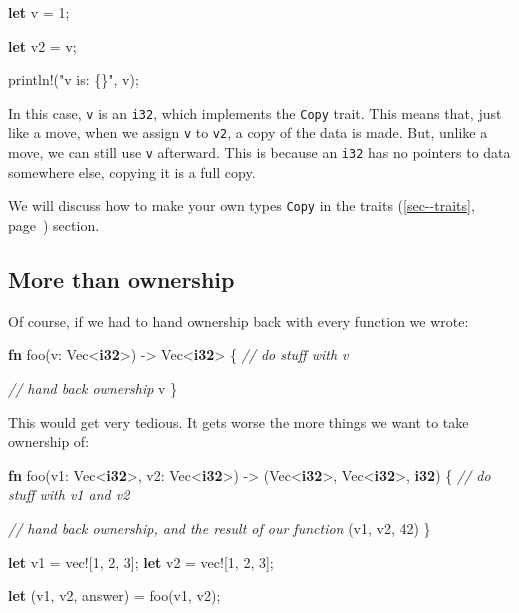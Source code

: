 \documentclass[a4paper,]{book}
\renewcommand*{\hyperref}[2][\ar]{%
  \def\ar{#2}%
  #2 (\autoref{#1}, page~\pageref{#1})}
\newenvironment{Shaded}{\begin{snugshade}}{\end{snugshade}}
\newcommand{\KeywordTok}[1]{\textcolor[rgb]{0.13,0.29,0.53}{\textbf{{#1}}}}
\newcommand{\DecValTok}[1]{\textcolor[rgb]{0.00,0.00,0.81}{{#1}}}
\newcommand{\StringTok}[1]{\textcolor[rgb]{0.31,0.60,0.02}{{#1}}}
\newcommand{\CommentTok}[1]{\textcolor[rgb]{0.56,0.35,0.01}{\textit{{#1}}}}
\newcommand{\OtherTok}[1]{\textcolor[rgb]{0.56,0.35,0.01}{{#1}}}
\newcommand{\NormalTok}[1]{{#1}}
\begin{document}
\begin{Shaded}
\begin{Highlighting}[]
\KeywordTok{let} \NormalTok{v = }\DecValTok{1}\NormalTok{;}

\KeywordTok{let} \NormalTok{v2 = v;}

\OtherTok{println!}\NormalTok{(}\StringTok{"v is: \{\}"}\NormalTok{, v);}
\end{Highlighting}
\end{Shaded}

In this case, \texttt{v} is an \texttt{i32}, which implements the
\texttt{Copy} trait. This means that, just like a move, when we assign
\texttt{v} to \texttt{v2}, a copy of the data is made. But, unlike a
move, we can still use \texttt{v} afterward. This is because an
\texttt{i32} has no pointers to data somewhere else, copying it is a
full copy.

We will discuss how to make your own types \texttt{Copy} in the
\hyperref[sec--traits]{traits} section.

\subsection{More than ownership}\label{more-than-ownership}

Of course, if we had to hand ownership back with every function we
wrote:

\begin{Shaded}
\begin{Highlighting}[]
\KeywordTok{fn} \NormalTok{foo(v: Vec<}\KeywordTok{i32}\NormalTok{>) -> Vec<}\KeywordTok{i32}\NormalTok{> \{}
    \CommentTok{// do stuff with v}

    \CommentTok{// hand back ownership}
    \NormalTok{v}
\NormalTok{\}}
\end{Highlighting}
\end{Shaded}

This would get very tedious. It gets worse the more things we want to
take ownership of:

\begin{Shaded}
\begin{Highlighting}[]
\KeywordTok{fn} \NormalTok{foo(v1: Vec<}\KeywordTok{i32}\NormalTok{>, v2: Vec<}\KeywordTok{i32}\NormalTok{>) -> (Vec<}\KeywordTok{i32}\NormalTok{>, Vec<}\KeywordTok{i32}\NormalTok{>, }\KeywordTok{i32}\NormalTok{) \{}
    \CommentTok{// do stuff with v1 and v2}

    \CommentTok{// hand back ownership, and the result of our function}
    \NormalTok{(v1, v2, }\DecValTok{42}\NormalTok{)}
\NormalTok{\}}

\KeywordTok{let} \NormalTok{v1 = }\OtherTok{vec!}\NormalTok{[}\DecValTok{1}\NormalTok{, }\DecValTok{2}\NormalTok{, }\DecValTok{3}\NormalTok{];}
\KeywordTok{let} \NormalTok{v2 = }\OtherTok{vec!}\NormalTok{[}\DecValTok{1}\NormalTok{, }\DecValTok{2}\NormalTok{, }\DecValTok{3}\NormalTok{];}

\KeywordTok{let} \NormalTok{(v1, v2, answer) = foo(v1, v2);}
\end{Highlighting}
\end{Shaded}
\end{document}
